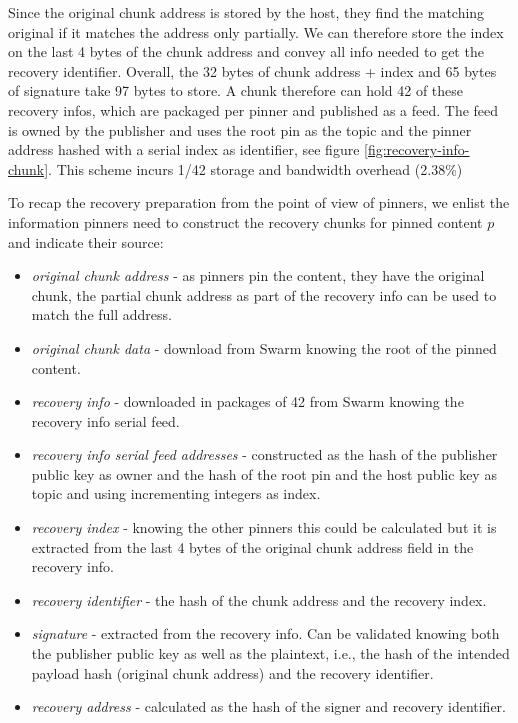 Since the original chunk address is stored by the host, they find the matching original if it matches the address  only partially. We can therefore store the index on the last 4  bytes of the chunk address and convey all info needed to get the recovery identifier. Overall, the 32 bytes of chunk address + index and 65 bytes of signature take 97 bytes to store.
A chunk therefore can hold 42 of these recovery infos, which are packaged per pinner and published as a feed. The feed is owned by the publisher and uses the root pin as the topic and the pinner address hashed with a serial index as identifier, see figure \ref{fig:recovery-info-chunk}.
This scheme incurs 1/42 storage and bandwidth overhead (2.38\%)

To recap the recovery preparation from the point of view of pinners, we enlist  the information pinners need to construct the recovery chunks for pinned content $p$ and indicate their source:

\begin{itemize}
\item \emph{original chunk address} - as pinners pin the content, they have the original chunk, the partial chunk address as part of the recovery info can be used to match the full address.
\item \emph{original chunk data} - download from Swarm knowing the root of the pinned content.
\item \emph{recovery info} - downloaded in packages of 42 from Swarm knowing the recovery info serial feed. 
\item \emph{recovery info serial feed addresses} - constructed as the hash of the publisher public key as owner and the hash of the root pin and the host public key as topic and using incrementing integers as index.
\item \emph{recovery index} - knowing the other pinners this could be calculated but it is extracted from the last 4 bytes of the original chunk address field in the recovery info. 
\item \emph{recovery identifier} - the hash of the chunk address and the recovery index.
\item \emph{signature} - extracted from the recovery info. Can be validated knowing both the publisher public key as well as the plaintext, i.e., the hash of the intended payload hash (original chunk address) and the recovery identifier.
\item \emph{recovery address} - calculated as the hash of the signer and recovery identifier.
\end{itemize}



